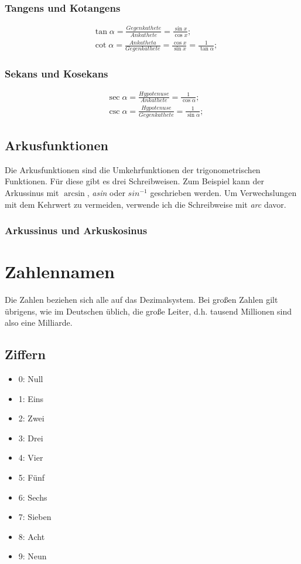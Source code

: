 \documentclass[a4paper]{article}
\begin{document}
\subsubsection{Tangens und Kotangens}
\begin{align*}
	&\tan{\alpha} = \frac{Gegenkathete}{Ankathete} = \frac{\sin{x}}{\cos{x}} ;
	\\
	&\cot{\alpha} = \frac{Ankatheta}{Gegenkathete} = \frac{\cos{x}}{\sin{x}} = \frac{1}{\tan{\alpha}} ;
\end{align*}

\subsubsection{Sekans und Kosekans}
\begin{align*}
	&\sec{\alpha} = \frac{Hypotenuse}{Ankathete} = \frac{1}{\cos{\alpha}} ;
	\\
	&\csc{\alpha} = \frac{Hypotenuse}{Gegenkathete} = \frac{1}{\sin{\alpha}} ;
\end{align*}

\subsection{Arkusfunktionen}
Die Arkusfunktionen sind die Umkehrfunktionen der trigonometrischen Funktionen.
F\"ur diese gibt es drei Schreibweisen.
Zum Beispiel kann der Arkussinus mit $ \arcsin $,
\textit{asin} oder $ sin^{-1} $ geschrieben werden.
Um Verwechslungen mit dem Kehrwert zu vermeiden,
verwende ich die Schreibweise mit \textit{arc} davor.

\subsubsection{Arkussinus und Arkuskosinus}

\newpage
\section{Zahlennamen}
Die Zahlen beziehen sich alle auf das Dezimalsystem.
Bei gro{\ss}en Zahlen gilt \"ubrigens,
wie im Deutschen \"ublich,
die gro{\ss}e Leiter,
d.h. tausend Millionen sind also eine Milliarde.

\subsection{Ziffern}
\begin{itemize}[nosep]
	\item 0: Null
	\item 1: Eins
	\item 2: Zwei
	\item 3: Drei
	\item 4: Vier
	\item 5: F\"unf
	\item 6: Sechs
	\item 7: Sieben
	\item 8: Acht
	\item 9: Neun
\end{itemize}
\end{document}
